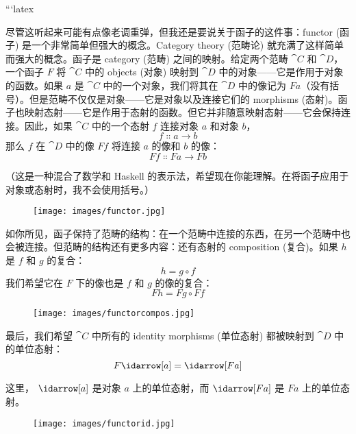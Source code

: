 ```latex

\lettrine[lhang=0.17]{尽}{管这听起来可能有点像老调重弹}，但我还是要说关于函子的这件事：functor (函子) 是一个非常简单但强大的概念。Category theory (范畴论) 就充满了这样简单而强大的概念。函子是 category (范畴) 之间的映射。给定两个范畴 $\cat{C}$ 和 $\cat{D}$，一个函子 $F$ 将 $\cat{C}$ 中的 objects (对象) 映射到 $\cat{D}$ 中的对象——它是作用于对象的函数。如果 $a$ 是 $\cat{C}$ 中的一个对象，我们将其在 $\cat{D}$ 中的像记为 $F a$（没有括号）。但是范畴不仅仅是对象——它是对象以及连接它们的 morphisms (态射)。函子也映射态射——它是作用于态射的函数。但它并非随意映射态射——它会保持连接。因此，如果 $\cat{C}$ 中的一个态射 $f$ 连接对象 $a$ 和对象 $b$，
\[f \Colon a \to b\]
那么 $f$ 在 $\cat{D}$ 中的像 $F f$ 将连接 $a$ 的像和 $b$ 的像：
\[F f \Colon F a \to F b\]

（这是一种混合了数学和 Haskell 的表示法，希望现在你能理解。在将函子应用于对象或态射时，我不会使用括号。）

\begin{figure}[H]
  \centering\texttt{[image: images/functor.jpg]}
\end{figure}

\noindent
如你所见，函子保持了范畴的结构：在一个范畴中连接的东西，在另一个范畴中也会被连接。但范畴的结构还有更多内容：还有态射的 composition (复合)。如果 $h$ 是 $f$ 和 $g$ 的复合：
\[h = g \circ f\]
我们希望它在 $F$ 下的像也是 $f$ 和 $g$ 的像的复合：
\[F h = F g \circ F f\]

\begin{figure}[H]
  \centering
  \texttt{[image: images/functorcompos.jpg]}
\end{figure}

\noindent
最后，我们希望 $\cat{C}$ 中所有的 identity morphisms (单位态射) 都被映射到 $\cat{D}$ 中的单位态射：
\[F \idarrow[a] = \idarrow[F a]\]

\noindent
这里， $\idarrow[a]$ 是对象 $a$ 上的单位态射，而 $\idarrow[F a]$ 是 $F a$ 上的单位态射。

\begin{figure}[H]
  \centering
  \texttt{[image: images/functorid.jpg]}
\end{figure}

